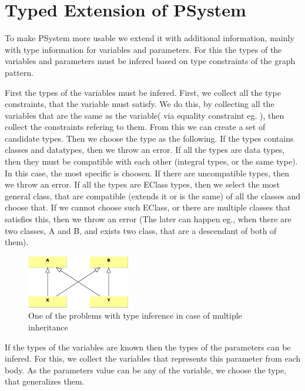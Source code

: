 \section{Typed Extension of PSystem}

To make PSystem more usable we extend it with additional information, mainly with type information for variables and parameters.
For this the types of the variables and parameters must be infered based on type constraints of the graph pattern.

First the types of the variables must be infered. 
First, we collect all the type constraints, that the variable must satisfy.
We do this, by collecting all the variables that are the same as the variable( via equality constraint eg. ), 
then collect the constraints refering to them.
From this we can create a set of candidate types.
Then we choose the type as the following. 
If the types contains classes and datatypes, then we throw an error.
If all the types are data types, then they must be compatible with each other (integral types, or the same type).
In this case, the most specific is choosen. If there are uncompatible types, then we throw an error.
If all the types are EClass types, then we select the most general class, that are compatible (extends it or is the same) of all the classes and choose that.
If we cannot choose such EClass, or there are multiple classes that satisfies this, then we throw an error (The later can happen eg., when there are two classes, A and B, and exists two class, that are a descendant of both of them).


\begin{figure}[h]
	\begin{center}
		\includegraphics[width=0.4\textwidth]{figures/multiple-inheritance-problem.pdf}
		\caption{One of the problems with type inference in case of multiple inheritance}
		\label{fig:multiple-inheritance-problem}
	\end{center}
\end{figure}

If the types of the variables are known then the types of the parameters can be infered. 
For this, we collect the variables that represents this parameter from each body.
As the parameters value can be any of the variable, we choose the type, that generalizes them.

